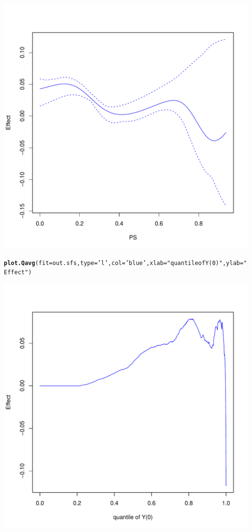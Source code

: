 \documentclass{article}\usepackage[]{graphicx}\usepackage[]{color}
\makeatletter
\def\maxwidth{ %
  \ifdim\Gin@nat@width>\linewidth
    \linewidth
  \else
    \Gin@nat@width
  \fi
}
\newcommand{\hlstr}[1]{\textcolor[rgb]{0.192,0.494,0.8}{#1}}%
\newcommand{\hlstd}[1]{\textcolor[rgb]{0.345,0.345,0.345}{#1}}%
\newcommand{\hlkwc}[1]{\textcolor[rgb]{0.333,0.667,0.333}{#1}}%
\newcommand{\hlkwd}[1]{\textcolor[rgb]{0.737,0.353,0.396}{\textbf{#1}}}%
\newenvironment{kframe}{%
 \def\at@end@of@kframe{}%
 \ifinner\ifhmode%
  \def\at@end@of@kframe{\end{minipage}}%
  \begin{minipage}{\columnwidth}%
 \fi\fi%
 \def\FrameCommand##1{\hskip\@totalleftmargin \hskip-\fboxsep
 \colorbox{shadecolor}{##1}\hskip-\fboxsep
     \hskip-\linewidth \hskip-\@totalleftmargin \hskip\columnwidth}%
 \MakeFramed {\advance\hsize-\width
   \@totalleftmargin\z@ \linewidth\hsize
   \@setminipage}}%
 {\par\unskip\endMakeFramed%
 \at@end@of@kframe}
\newenvironment{knitrout}{}{} %
\makeatother
\begin{document}
\begin{knitrout}
{\centering \includegraphics[width=\maxwidth]{figures/SFS-heatmap-2} 

}


\begin{kframe}\begin{alltt}
\hlkwd{plot.Qavg}\hlstd{(}\hlkwc{fit}\hlstd{=out.sfs  ,} \hlkwc{type}\hlstd{=}\hlstr{'l'} \hlstd{,} \hlkwc{col}\hlstd{=}\hlstr{'blue'} \hlstd{,} \hlkwc{xlab}\hlstd{=}\hlstr{"quantile of Y(0)"} \hlstd{,} \hlkwc{ylab}\hlstd{=}\hlstr{"Effect"}\hlstd{)}
\end{alltt}
\end{kframe}

{\centering \includegraphics[width=\maxwidth]{figures/SFS-heatmap-3} 

}



\end{knitrout}
\end{document}
